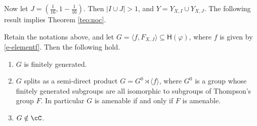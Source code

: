 \documentclass[reqno]{amsart}
\newcommand{\Hphi}{\mathsf{H}(\varphi)}
\begin{document}
Now let $J=(\frac{1}{16}, 1-\frac{1}{16})$. Then $|I\cup J|>1$, and $Y=Y_{X, I}\cup Y_{X, J}$. 
The following result implies Theorem \ref{teo:noc}.
\begin{prop}
Retain the notations above, and let $G=\langle f, F_{X, J}\rangle \subseteq \Hphi$, where $f$ is given by \eqref{e-elementf}. Then the following hold.
\begin{enumerate}
\item \label{i-Gfg} $G$ is finitely generated.
    \item \label{i-Gsemidirect} $G$ splits as a semi-direct product $G=G^0\rtimes \langle f\rangle$, where $G^0$ is a group whose finitely generated subgroups are all isomorphic to subgroups of Thompson's group $F$. In particular $G$ is amenable if and only if $F$ is amenable.
    
    \item \label{i-GnotinC} $G\notin \cC$.
\end{enumerate}
\end{prop}
\end{document}
